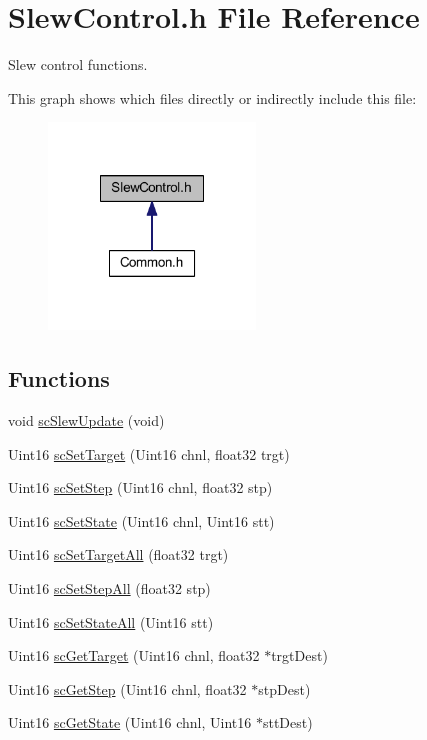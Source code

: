 \hypertarget{a00035}{\section{Slew\-Control.\-h File Reference}
\label{a00035}
}


Slew control functions.  


This graph shows which files directly or indirectly include this file\-:\nopagebreak
\begin{figure}[H]
\begin{center}
\leavevmode
\includegraphics[width=156pt]{a00057}
\end{center}
\end{figure}
\subsection*{Functions}
\begin{DoxyCompactItemize}
\item 
void \hyperlink{a00035_a8f8f2b1ef59b7fa90122e5609e24cd06}{sc\-Slew\-Update} (void)
\item 
Uint16 \hyperlink{a00035_acd4f1d77c353f333438ae688a9bcc8fe}{sc\-Set\-Target} (Uint16 chnl, float32 trgt)
\item 
Uint16 \hyperlink{a00035_a91e197a77f8f6c05dc478431164114a4}{sc\-Set\-Step} (Uint16 chnl, float32 stp)
\item 
Uint16 \hyperlink{a00035_a92578a062af02eb967ca2dfbd68b00cf}{sc\-Set\-State} (Uint16 chnl, Uint16 stt)
\item 
Uint16 \hyperlink{a00035_a1e7d07e1a6d9b1e40b1b39d97df638b9}{sc\-Set\-Target\-All} (float32 trgt)
\item 
Uint16 \hyperlink{a00035_a2dbe145695a65570ebc1ff5588e08a18}{sc\-Set\-Step\-All} (float32 stp)
\item 
Uint16 \hyperlink{a00035_af4b016a1a10639dfeca7af4f750d8c75}{sc\-Set\-State\-All} (Uint16 stt)
\item 
Uint16 \hyperlink{a00035_ab83b8f320a4bf9e8ea1a251fec458032}{sc\-Get\-Target} (Uint16 chnl, float32 $\ast$trgt\-Dest)
\item 
Uint16 \hyperlink{a00035_adac64f58de9a029d849e0df2962bad16}{sc\-Get\-Step} (Uint16 chnl, float32 $\ast$stp\-Dest)
\item 
Uint16 \hyperlink{a00035_a77a235d70df3aff6a742ff375bd45119}{sc\-Get\-State} (Uint16 chnl, Uint16 $\ast$stt\-Dest)
\end{DoxyCompactItemize}


